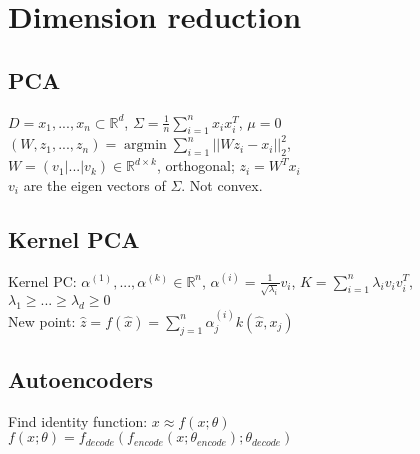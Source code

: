 \section*{Dimension reduction}
\subsection*{PCA}
$D={x_1,...,x_n} \subset \mathbb{R}^d$,
$\Sigma = \frac{1}{n}\sum_{i=1}^n x_i x_i^T$, $\mu = 0$\\
$(W,z_1,...,z_n) = \operatorname{argmin} \sum_{i=1}^n||W z_i - x_i||_2^2$,\\
$W = (v_1|...|v_k) \in \mathbb{R}^{d \times k}$, orthogonal; $z_i = W^T x_i$ \\ 
$v_i$ are the eigen vectors of $\Sigma$. Not convex. 

\subsection*{Kernel PCA}
Kernel PC: $\alpha^{(1)},...,\alpha^{(k)}\in \mathbb{R}^n$, $\alpha^{(i)} = \frac{1}{\sqrt{\lambda_i}}v_i$, $K = \sum_{i=1}^n \lambda_i v_i v_i^T$, $\lambda_1 \geq ... \geq \lambda_d \geq 0$\\
New point: $\hat{z} = f(\hat{x}) = \sum_{j=1}^n\alpha_j^{(i)}k(\hat{x},x_j)$

\subsection*{Autoencoders}
Find identity function: $x \approx f(x;\theta)$\\
$f(x;\theta) = f_{decode}(f_{encode}(x;\theta_{encode});\theta_{decode})$